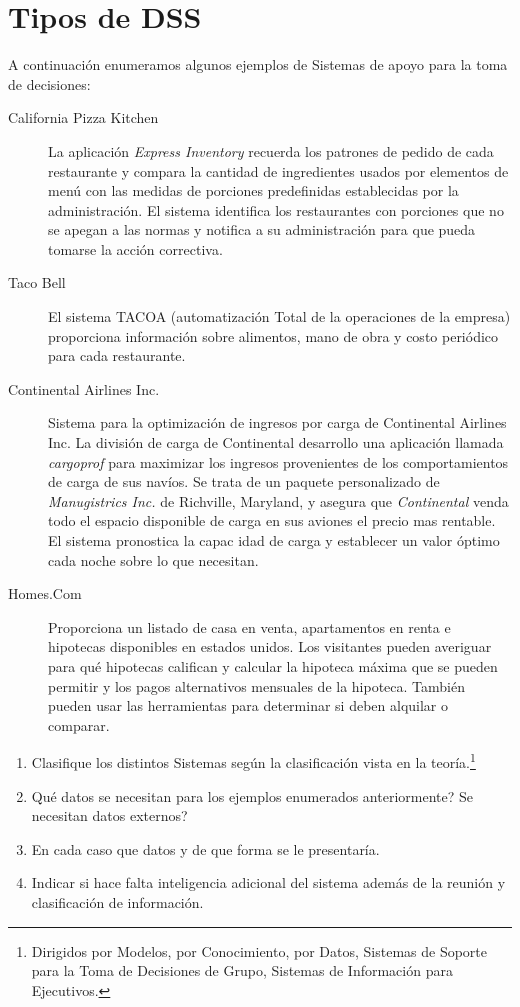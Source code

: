 \documentclass{article}
\begin{document}
\section{Tipos de DSS}
A continuación enumeramos algunos ejemplos de Sistemas de apoyo para la toma de decisiones:
\begin{description}
    \item[California Pizza Kitchen] La aplicación \emph{Express Inventory} recuerda los patrones de pedido
de cada restaurante y compara la cantidad de ingredientes usados por elementos de menú con las medidas de porciones predefinidas establecidas por la administración. El sistema identifica los restaurantes con porciones que no se apegan a las normas y notifica a su administración para que pueda tomarse la acción correctiva. %
    \item[Taco Bell] El sistema TACOA (automatización Total de la operaciones de la empresa) proporciona información sobre  alimentos, mano de obra y costo periódico para cada restaurante. %
    \item[Continental Airlines Inc.] Sistema para la optimización de ingresos por carga de Continental Airlines Inc. La división de carga de Continental desarrollo una aplicación llamada \emph{cargoprof} para maximizar los ingresos provenientes de los comportamientos de carga de sus navíos. Se trata de un paquete personalizado de \emph{Manugistrics Inc. } de Richville, Maryland, y asegura que \emph{Continental} venda todo el espacio disponible de carga en sus aviones el precio mas rentable. El sistema pronostica la capac idad de carga y establecer un valor óptimo cada noche sobre lo que necesitan. %
    \item[Homes.Com] Proporciona un listado de casa en venta, apartamentos en renta e hipotecas disponibles en estados
unidos. Los visitantes pueden averiguar para qué hipotecas califican y calcular la hipoteca máxima que se pueden permitir y los
pagos alternativos mensuales de la hipoteca. También pueden usar las herramientas para determinar si deben alquilar o comparar. %
\end{description}

\begin{enumerate}
    \item Clasifique los distintos Sistemas según la clasificación vista en la teoría.\footnote{Dirigidos por Modelos, por Conocimiento, por Datos, Sistemas de Soporte para la Toma de Decisiones de Grupo, Sistemas de Información para Ejecutivos.}
    \item Qué datos se necesitan para los ejemplos enumerados anteriormente? Se necesitan datos externos?
    \item En cada caso que datos y de que forma se le presentaría.
	\item Indicar si hace falta inteligencia adicional del sistema además de la reunión y clasificación de información.
\end{enumerate}
\end{document}

